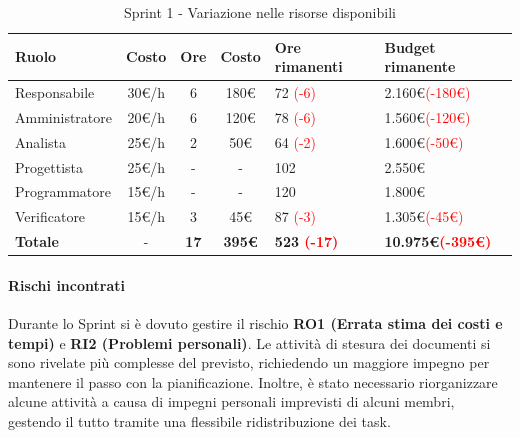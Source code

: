 \documentclass[a4paper,12pt]{article}
\begin{document}
\begin{table}[H]
    \centering
    \renewcommand{\arraystretch}{1.5}
    \begin{tabularx}{\textwidth}{|l|c|c|c|X|X|}
        \hline
        \rowcolor{tableHeader}
        \textbf{Ruolo} & \textbf{Costo} & \textbf{Ore} & \textbf{Costo} & \textbf{Ore rimanenti} & \textbf{Budget rimanente} \\
        \hline
        \rowcolor{tableLineOdd}
        Responsabile & 30\euro/h & 6 & 180\euro & 72 \textcolor{red}{(-6)} & 2.160\euro \textcolor{red}{(-180\euro)} \\
        \hline
        \rowcolor{tableLineEven}
        Amministratore & 20\euro/h & 6 & 120\euro & 78 \textcolor{red}{(-6)} & 1.560\euro \textcolor{red}{(-120\euro)} \\
        \hline
        \rowcolor{tableLineOdd}
        Analista & 25\euro/h & 2 & 50\euro & 64 \textcolor{red}{(-2)} & 1.600\euro \textcolor{red}{(-50\euro)} \\
        \hline
        \rowcolor{tableLineEven}
        Progettista & 25\euro/h & - & - & 102 & 2.550\euro \\
        \hline
        \rowcolor{tableLineOdd}
        Programmatore & 15\euro/h & - & - & 120 & 1.800\euro \\
        \hline
        \rowcolor{tableLineEven}
        Verificatore & 15\euro/h & 3 & 45\euro & 87 \textcolor{red}{(-3)} & 1.305\euro \textcolor{red}{(-45\euro)} \\
        \hline
        \rowcolor{tableHeader}
        \textbf{Totale} & - & \textbf{17} & \textbf{395\euro} & \textbf{523 \textcolor{red}{(-17)}} & \textbf{10.975\euro \textcolor{red}{(-395\euro)}} \\
        \hline
    \end{tabularx}
    \caption{Sprint 1 - Variazione nelle risorse disponibili}
\end{table}

\paragraph{Rischi incontrati}
Durante lo Sprint si è dovuto gestire il rischio \textbf{RO1 (Errata stima dei costi e tempi)} e \textbf{RI2 (Problemi personali)}. Le attività di stesura dei documenti si sono rivelate più complesse del previsto, richiedendo un maggiore impegno per mantenere il passo con la pianificazione. Inoltre, è stato necessario riorganizzare alcune attività a causa di impegni personali imprevisti di alcuni membri, gestendo il tutto tramite una flessibile ridistribuzione dei task.
\end{document}
